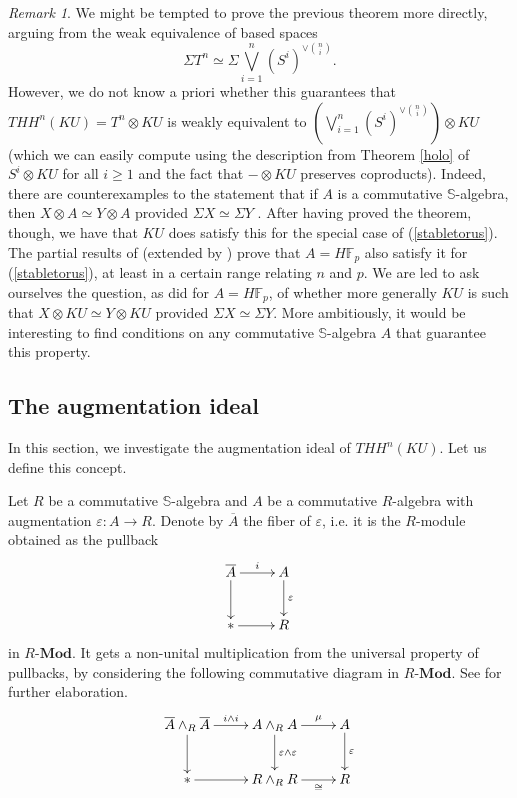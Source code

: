 \documentclass[a4paper,11pt]{amsart} %
\renewcommand{\epsilon}{\varepsilon}
\theoremstyle{definition} \newtheorem{defn}[equation]{Definition}
\theoremstyle{remark} \newtheorem{notation}[equation]{Notation}
\theoremstyle{plain} \newtheorem{teo}[equation]{Theorem}
\theoremstyle{plain} \newtheorem{lema}[equation]{Lemma}
\theoremstyle{plain} \newtheorem{prop}[equation]{Proposition}
\theoremstyle{plain} \newtheorem{corolario}[equation]{Corollary}
\theoremstyle{remark} \newtheorem{obs}[equation]{Remark}
\theoremstyle{remark} \newtheorem{sideobs}[equation]{Side remark}
\theoremstyle{remark} \newtheorem{ejercicio}[equation]{Exercise}
\theoremstyle{definition} \newtheorem{notn}[equation]{Notation}
\theoremstyle{remark} \newtheorem{ej}[equation]{Example}
\theoremstyle{remark} \newtheorem{contraej}[equation]{Counterexample}
\theoremstyle{plain} \newtheorem{conj}[equation]{Conjecture}
\newcommand{\F}{\mathbb{F}}
\renewcommand{\1}{\ensuremath{\mathbbm{1}}}
\renewcommand{\S}{\mathbb{S}}
\newcommand{\bobs}{\begin{obs}}
\newcommand{\eobs}{\end{obs}}
\newcommand{\RMod}{\ensuremath{R}\mbox{-}\mathbf{Mod}}
\numberwithin{equation}{section}
\begin{document}
\bobs \label{stabeq} We might be tempted to prove the previous theorem more directly, arguing from the weak equivalence of based spaces
\begin{equation}\label{stabletorus}\Sigma T^n\simeq \Sigma \bigvee\limits_{i=1}^n (S^i)^{\vee {n \choose i}}.\end{equation} However, we do not know a priori whether this guarantees that $THH^n(KU)= T^n\otimes KU$ is weakly equivalent to $\left( \bigvee\limits_{i=1}^n (S^i)^{\vee {n \choose i}}\right) \otimes KU$ (which we can easily compute using the description from Theorem \ref{holo} of $S^i \otimes KU$ for all $i\geq 1$ and the fact that $-\otimes KU$ preserves coproducts). Indeed, there are counterexamples to the statement that if $A$ is a commutative $\S$-algebra, then $X\otimes A \simeq Y\otimes A$ provided $\Sigma X \simeq \Sigma Y$ \cite{dundas-tenti}. After having proved the theorem, though, we have that $KU$ does satisfy this for the special case of (\ref{stabletorus}). The partial results of \cite{veen} (extended by \cite{blprz}) prove that $A=H\F_p$ also satisfy it for (\ref{stabletorus}), at least in a certain range relating $n$ and $p$. 
We are led to ask ourselves the question, as \cite[4.1]{dundas-tenti} did for $A=H\F_p$, of whether more generally $KU$ is such that $X\otimes KU \simeq Y\otimes KU$ provided $\Sigma X\simeq \Sigma Y$. More ambitiously, it would be interesting to find conditions on any commutative $\S$-algebra $A$ that guarantee this property.\eobs

\subsection{The augmentation ideal} \label{second-desc}In this section, we investigate the augmentation ideal of \linebreak $THH^n(KU)$. Let us define this concept.

%

Let $R$ be a commutative $\S$-algebra and $A$ be a commutative $R$-algebra with augmentation $\epsilon:A\to R$. Denote by $\overline A$ the fiber of $\epsilon$, i.e. it is the $R$-module obtained as the pullback
\[\xymatrix{\overline A \ar[d] \ar[r]^-i & A \ar[d]^-\epsilon \\ {*} \ar[r] & R}\] 
in $\RMod$. It gets a non-unital multiplication from the universal property of pullbacks, by considering the following commutative diagram in $\RMod$. See \cite[Section 2]{basterra} for further elaboration.
\[\xymatrix{\overline A \wedge_R \overline A \ar[d] \ar[r]^{i\wedge i} & A \wedge_R A \ar[d]^-{\epsilon \wedge \epsilon} \ar[r]^-\mu & A \ar[d]^-\epsilon \\ {*} \ar[r] & R \wedge_R R \ar[r]_-\cong & R}\]
\end{document}
